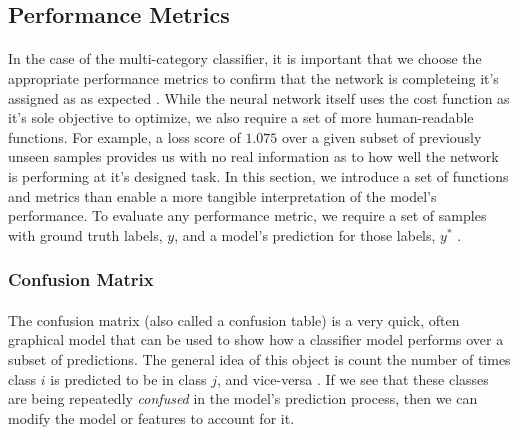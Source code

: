 \documentclass[12pt,letterpaper]{article}
\begin{document}
\subsection{Performance Metrics}

\paragraph*{}In the case of the multi-category classifier, it is important that we choose the appropriate performance metrics to confirm that the network is completeing it's assigned as as expected \cite{Geron}. While the neural network itself uses the cost function as it's sole objective to optimize, we also require a set of more human-readable functions. For example, a loss score of $1.075$ over a given subset of previously unseen samples provides us with no real information as to how well the network is performing at it's designed task.  In this section, we introduce a set of functions and metrics than enable a more tangible interpretation of the model's performance. To evaluate any performance metric, we require a set of samples with ground truth labels, $y$, and a model's prediction for those labels, $y^*$ \cite{Goodfellow,James}.


\subsubsection{Confusion Matrix}

\paragraph*{}The confusion matrix (also called a confusion table) is a very quick, often graphical model that can be used to show how a classifier model performs over a subset of predictions. The general idea of this object is count the number of times class $i$ is predicted to be in class $j$, and vice-versa \cite{Geron}. If we see that these classes are being repeatedly \textit{confused} in the model's prediction process, then we can modify the model or features to account for it. 
\end{document}
